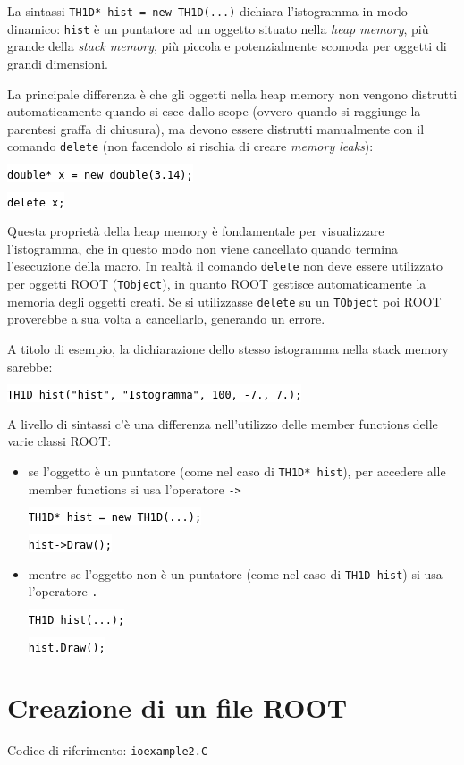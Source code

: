 \documentclass{article}
\newcommand{\ttt}{\texttt}
\newcommand{\tcpp}[1]{\hspace{10pt}\colorbox{background}{\textcolor{black}{\texttt{#1}}}}
\begin{document}
La sintassi \ttt{TH1D* hist = new TH1D(...)} dichiara l'istogramma in modo dinamico: \ttt{hist} è un puntatore ad un oggetto situato nella \textit{heap memory}, più grande della \textit{stack memory}, più piccola e potenzialmente scomoda per oggetti di grandi dimensioni.

La principale differenza è che gli oggetti nella heap memory non vengono distrutti automaticamente quando si esce dallo scope (ovvero quando si raggiunge la parentesi graffa di chiusura), ma devono essere distrutti manualmente con il comando \ttt{delete} (non facendolo si rischia di creare \textit{memory leaks}):

\tcpp{double* x = new double(3.14);}

\tcpp{delete x;}

Questa proprietà della heap memory è fondamentale per visualizzare l'istogramma, che in questo modo non viene cancellato quando termina l'esecuzione della macro.
In realtà il comando \ttt{delete} non deve essere utilizzato per oggetti ROOT (\texttt{TObject}), in quanto ROOT gestisce automaticamente la memoria degli oggetti creati.
Se si utilizzasse \ttt{delete} su un \ttt{TObject} poi ROOT proverebbe a sua volta a cancellarlo, generando un errore.

A titolo di esempio, la dichiarazione dello stesso istogramma nella stack memory sarebbe:

\tcpp{TH1D hist("hist", "Istogramma", 100, -7., 7.);}

\newpage
A livello di sintassi c'è una differenza nell'utilizzo delle member functions delle varie classi ROOT:
\begin{itemize}
    \item se l'oggetto è un puntatore (come nel caso di \ttt{TH1D* hist}), per accedere alle member functions si usa l'operatore \ttt{->}

    \tcpp{TH1D* hist = new TH1D(...);}

    \tcpp{hist->Draw();}

    \vspace{10pt}

    \item mentre se l'oggetto non è un puntatore (come nel caso di \ttt{TH1D hist}) si usa l'operatore \ttt{.}

    \tcpp{TH1D hist(...);}

    \tcpp{hist.Draw();}

\end{itemize}
\section{Creazione di un file ROOT}
Codice di riferimento: \ttt{ioexample2.C} \vspace{10pt}
\end{document}
